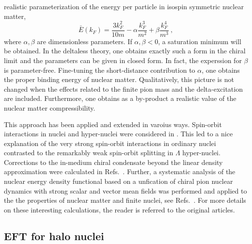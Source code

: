 \documentclass[aps,rmp,nofootinbib,twocolumn,floatfix]{revtex4}
\newcommand{\beq}{\begin{equation}}
\newcommand{\eeq}{\end{equation}}
\begin{document}
realistic parameterization of the energy per particle in isospin symmetric
nuclear matter,
\beq
\bar{E}(k_F) = \frac{3k_F^2}{10m} - \alpha \frac{k_F^3}{m^2} +
\beta \frac{k_F^4}{m^3}~,
\eeq
where $\alpha, \beta$ are dimensionless parameters. If $\alpha, \beta <0$,
a saturation minimum will be obtained. In the deltaless
theory, one obtains exactly such a form in the chiral limit and the parameters 
can be given in closed form. In fact, the experssion for $\beta$ is
parameter-free. Fine-tuning the 
short-distance contribution to $\alpha$, one obtains the proper binding
energy of nuclear matter. Qualitatively, this picture is not changed
when the effects related to the finite pion mass and the delta-excitation
are included. Furthermore, one obtains as a by-product a realistic value of
the nuclear matter compressibility.

This approach has been applied and extended in varoius ways. Spin-orbit 
interactions in nuclei and hyper-nuclei were considered in
\cite{Kaiser:2002yg,Kaiser:2003ux,Kaiser:2004fe,Kaiser:2008gq}. 
This led to a nice explanation of the very strong spin-orbit interactions 
in ordinary nuclei contrasted to
the remarkably weak spin-orbit splitting in $\Lambda$ hyper-nuclei. Corrections
to the in-medium chiral condensate beyond the linear density approximation
were calculated in Refs.~\cite{Kaiser:2007nv,Kaiser:2008qu}. Further, 
a systematic analysis of the nuclear energy density functional based on 
a unfication of chiral pion nuclear dynamics with strong scalar and
vector mean fields was performed and applied to the the properties of
nuclear matter and finite nuclei, see 
Refs.~\cite{Kaiser:2002jz,Finelli:2002na,Finelli:2003fk,Finelli:2007wm}.
For more details on these interesting calculations, the reader is referred
to the original articles.


\subsection{EFT for halo nuclei}
\end{document}
